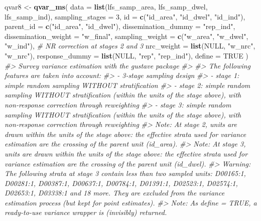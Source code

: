 \documentclass[
]{article}
\newenvironment{Shaded}{\begin{snugshade}}{\end{snugshade}}
\newcommand{\AttributeTok}[1]{\textcolor[rgb]{0.13,0.29,0.53}{#1}}
\newcommand{\CommentTok}[1]{\textcolor[rgb]{0.56,0.35,0.01}{\textit{#1}}}
\newcommand{\ConstantTok}[1]{\textcolor[rgb]{0.56,0.35,0.01}{#1}}
\newcommand{\DecValTok}[1]{\textcolor[rgb]{0.00,0.00,0.81}{#1}}
\newcommand{\FunctionTok}[1]{\textcolor[rgb]{0.13,0.29,0.53}{\textbf{#1}}}
\newcommand{\NormalTok}[1]{#1}
\newcommand{\OtherTok}[1]{\textcolor[rgb]{0.56,0.35,0.01}{#1}}
\newcommand{\StringTok}[1]{\textcolor[rgb]{0.31,0.60,0.02}{#1}}
\begin{document}
\begin{Shaded}
\begin{Highlighting}[]
\NormalTok{qvar8 }\OtherTok{\textless{}{-}} \FunctionTok{qvar\_ms}\NormalTok{(}
  \AttributeTok{data =} \FunctionTok{list}\NormalTok{(lfs\_samp\_area, lfs\_samp\_dwel, lfs\_samp\_ind),}
  \AttributeTok{sampling\_stages =} \DecValTok{3}\NormalTok{,}
  \AttributeTok{id =} \FunctionTok{c}\NormalTok{(}\StringTok{"id\_area"}\NormalTok{, }\StringTok{"id\_dwel"}\NormalTok{, }\StringTok{"id\_ind"}\NormalTok{),}
  \AttributeTok{parent\_id =} \FunctionTok{c}\NormalTok{(}\StringTok{"id\_area"}\NormalTok{, }\StringTok{"id\_dwel"}\NormalTok{),}
  \AttributeTok{dissemination\_dummy =} \StringTok{"rep\_ind"}\NormalTok{,}
  \AttributeTok{dissemination\_weight =} \StringTok{"w\_final"}\NormalTok{,}
  \AttributeTok{sampling\_weight =} \FunctionTok{c}\NormalTok{(}\StringTok{"w\_area"}\NormalTok{, }\StringTok{"w\_dwel"}\NormalTok{, }\StringTok{"w\_ind"}\NormalTok{),}
  \CommentTok{\# NR correction at stages 2 and 3}
  \AttributeTok{nrc\_weight =} \FunctionTok{list}\NormalTok{(}\ConstantTok{NULL}\NormalTok{, }\StringTok{"w\_nrc"}\NormalTok{, }\StringTok{"w\_nrc"}\NormalTok{),}
  \AttributeTok{response\_dummy =} \FunctionTok{list}\NormalTok{(}\ConstantTok{NULL}\NormalTok{, }\StringTok{"rep"}\NormalTok{, }\StringTok{"rep\_ind"}\NormalTok{),}
  \AttributeTok{define =} \ConstantTok{TRUE}
\NormalTok{)}
\CommentTok{\#\textgreater{} Survey variance estimation with the gustave package}
\CommentTok{\#\textgreater{} }
\CommentTok{\#\textgreater{} The following features are taken into account:}
\CommentTok{\#\textgreater{}   {-} 3{-}stage sampling design}
\CommentTok{\#\textgreater{}   {-} stage 1: simple random sampling WITHOUT stratification}
\CommentTok{\#\textgreater{}   {-} stage 2: simple random sampling WITHOUT stratification (within the units of the stage above), with non{-}response correction through reweighting}
\CommentTok{\#\textgreater{}   {-} stage 3: simple random sampling WITHOUT stratification (within the units of the stage above), with non{-}response correction through reweighting}
\CommentTok{\#\textgreater{} Note: At stage 2, units are drawn within the units of the stage above: the effective strata used for variance estimation are the crossing of the parent unit (id\_area).}
\CommentTok{\#\textgreater{} Note: At stage 3, units are drawn within the units of the stage above: the effective strata used for variance estimation are the crossing of the parent unit (id\_dwel).}
\CommentTok{\#\textgreater{} Warning: The following strata at stage 3 contain less than two sampled units: D00165:1, D00281:1, D00387:1, D00637:1, D00784:1, D01391:1, D02523:1, D02574:1, D02653:1, D03338:1 and 18 more. They are excluded from the variance estimation process (but kept for point estimates).}
\CommentTok{\#\textgreater{} Note: As define = TRUE, a ready{-}to{-}use variance wrapper is (invisibly) returned.}
\end{Highlighting}
\end{Shaded}
\end{document}
